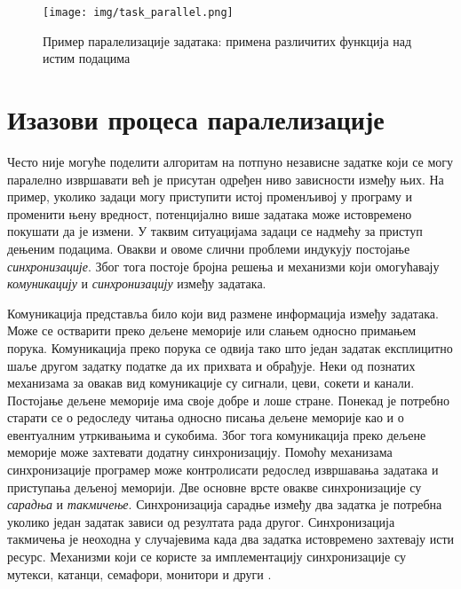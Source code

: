 \documentclass[12pt,oneside]{memoir}
\begin{document}
\begin{figure}[!ht]
  \centering
  \texttt{[image: img/task\_parallel.png]}
  \caption{Пример паралелизације задатака: примена различитих функција над истим подацима}
  \label{fig:task_parallel}
\end{figure}


  \section{Изазови процеса паралелизације}
  Често није могуће поделити алгоритам на потпуно независне задатке који се могу паралелно извршавати већ је присутан одређен ниво зависности између њих. На пример, уколико задаци могу приступити истој променљивој у програму и променити њену вредност, потенцијално више задатака може истовремено покушати да је измени. У таквим ситуацијама задаци се надмећу за приступ дењеним подацима.  Овакви и овоме слични проблеми индукују постојање \textit{синхронизације}. Због тога постоје бројна решења и механизми који омогућавају \textit{комуникацију} и  \textit{синхронизацију} између задатака.
  
  
Комуникација представља било који вид размене информација између задатака. Може се остварити преко дељене меморије или слањем односно примањем порука. Комуникација преко порука се одвија тако што један задатак експлицитно шаље другом задатку податке да их прихвата и обрађује. Неки од познатих механизама за овакав вид комуникације су сигнали, цеви, сокети и канали.
Постојање дељене меморије има своје добре и лоше стране. Понекад је потребно старати се о редоследу читања односно писања дељене меморије као и о евентуалним утркивањима и сукобима. Због тога комуникација преко дељене меморије може захтевати додатну синхронизацију. Помоћу механизама синхронизације програмер може контролисати редослед извршавања задатака и приступања дељеној меморији. Две основне врсте овакве синхронизације су \textit{сарадња} и \textit{такмичење}. Синхронизација сарадње између два задатка је потребна уколико један задатак зависи од резултата рада другог. Синхронизација такмичења је неоходна у случајевима када два задатка истовремено захтевају исти ресурс. Механизми који се користе за имплементацију синхронизације су мутекси, катанци, семафори, монитори и други \cite{lang_prag}.
\end{document}
